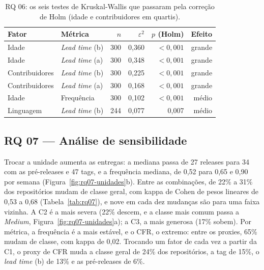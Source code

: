 \documentclass[12pt]{article}
\begin{document}
\begin{table}[t]
  \centering
  \caption{RQ 06: os seis testes de Kruskal-Wallis que passaram pela correção de
    Holm (idade e contribuidores em quartis).}
  \label{tab:rq06}
  \footnotesize
  \begin{tabular}{@{}llrrrr@{}}
    \toprule
    Fator & Métrica & $n$ & $\varepsilon^2$ & $p$ (Holm) & Efeito \\
    \midrule
    Idade & \emph{Lead time} (b) & 300 & 0,360 & $< 0{,}001$ & grande \\
    Idade & \emph{Lead time} (a) & 300 & 0,348 & $< 0{,}001$ & grande \\
    Contribuidores & \emph{Lead time} (b) & 300 & 0,225 & $< 0{,}001$ & grande \\
    Contribuidores & \emph{Lead time} (a) & 300 & 0,168 & $< 0{,}001$ & grande \\
    Idade & Frequência & 300 & 0,102 & $< 0{,}001$ & médio \\
    Linguagem & \emph{Lead time} (b) & 244 & 0,077 & 0,007 & médio \\
    \bottomrule
  \end{tabular}
\end{table}

\subsection{RQ 07 --- Análise de sensibilidade}
\label{sec:rq07}

Trocar a unidade aumenta as entregas: a mediana passa de 27 releases para 34
com as pré-releases e 47 tags, e a frequência mediana, de 0,52 para 0,65 e 0,90
por semana (Figura~\ref{fig:rq07-unidades}b). Entre as combinações, de 22\% a
31\% dos repositórios mudam de classe geral, com kappa de Cohen de pesos
lineares \cite{cohen1968,pedregosa2011} de 0,53 a 0,68 (Tabela~\ref{tab:rq07}), e nove
em cada dez mudanças são para uma faixa vizinha. A C2 é a mais severa (22\%
descem, e a classe mais comum passa a \emph{Medium},
Figura~\ref{fig:rq07-unidades}a); a C3, a mais generosa (17\% sobem). Por
métrica, a frequência é a mais estável, e o CFR, o extremo: entre os proxies,
65\% mudam de classe, com kappa de 0,02. Trocando um fator de cada vez a partir
da C1, o proxy de CFR muda a classe geral de 24\% dos repositórios, a tag de
15\%, o \emph{lead time} (b) de 13\% e as pré-releases de 6\%.
\end{document}
